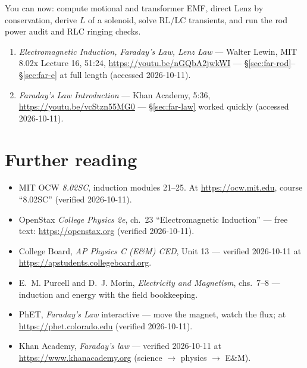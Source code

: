 \begin{wins}
You can now: compute motional and transformer EMF, direct Lenz by
conservation, derive $L$ of a solenoid, solve RL/LC transients, and run
the rod power audit and RLC ringing checks.
\end{wins}


\begin{rulebox}
\begin{enumerate}
\item \emph{Electromagnetic Induction, Faraday's Law, Lenz Law} ---
Walter Lewin, MIT 8.02x Lecture 16, 51:24,
\url{https://youtu.be/nGQbA2jwkWI} ---
\S\ref{sec:far-rod}--\S\ref{sec:far-e} at full length (accessed
2026-10-11).
\item \emph{Faraday's Law Introduction} --- Khan Academy, 5:36,
\url{https://youtu.be/vcStzn55MG0} --- \S\ref{sec:far-law} worked
quickly (accessed 2026-10-11).
\end{enumerate}
\end{rulebox}

\section*{Further reading}

\begin{itemize}
\item MIT OCW \emph{8.02SC}, induction modules 21--25. At
\url{https://ocw.mit.edu}, course ``8.02SC'' (verified 2026-10-11).
\item OpenStax \emph{College Physics 2e}, ch.~23 ``Electromagnetic
Induction'' --- free text: \url{https://openstax.org} (verified
2026-10-11).
\item College Board, \emph{AP Physics C (E\&M) CED}, Unit 13 ---
verified 2026-10-11 at \url{https://apstudents.collegeboard.org}.
\item E.~M. Purcell and D.~J. Morin, \emph{Electricity and Magnetism},
chs.~7--8 --- induction and energy with the field bookkeeping.
\item PhET, \emph{Faraday's Law} interactive --- move the magnet, watch
the flux; at \url{https://phet.colorado.edu} (verified 2026-10-11).
\item Khan Academy, \emph{Faraday's law} ---
verified 2026-10-11 at \url{https://www.khanacademy.org}
(science $\to$ physics $\to$ E\&M).
\end{itemize}

